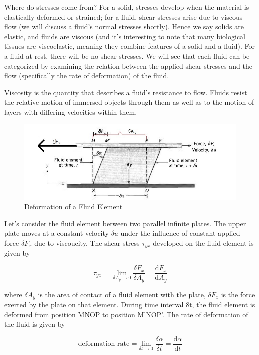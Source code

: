 \documentclass{article}
\begin{document}
Where do stresses come from? For a solid, stresses develop when the material is elastically deformed or strained; for a fluid, shear stresses arise due to viscous flow (we
will discuss a fluid's normal stresses shortly). Hence we say solids are elastic, and
fluids are viscous (and it's interesting to note that many biological tissues are viscoelastic, meaning they combine features of a solid and a fluid). For a fluid at rest,
there will be no shear stresses. We will see that each fluid can be categorized by examining the relation between the applied shear stresses and the flow (specifically the
rate of deformation) of the fluid.

Viscosity is the quantity that describes a fluid's resistance to flow. Fluids resist the relative motion of immersed objects through them as well as to the motion of layers with differing velocities within them.

\begin{figure}[h]
\includegraphics[width=\linewidth]{schematic for viscousity.jpg}
\caption{Deformation of a Fluid Element}
\label{fig:schem_vis}
\end{figure}

Let's consider the fluid element between two parallel infinite plates. The upper plate moves at a constant velocity $\delta u$ under the influence of constant applied force $\delta F_{x}$ due to viscoucity. The shear stress $\tau_{yx}$ developed on the fluid element is given by

$$\tau_{yx} = \lim_{\delta A_{y} \to 0} \frac{\delta F_{x}}{\delta A_{y}} = \frac{\text{d}F_{x}}{\text{d}A_{y}}$$

where $\delta A_{y}$ is the area of contact of a fluid element with the plate, $\delta F_{x}$ is the force exerted by the plate on that element. During time interval 8t, the fluid element is deformed from position MNOP to position M'NOP'. The rate of deformation of the
fluid is given by

$$\text{deformation rate =} \lim_{\delta t \to 0} \frac{\delta \alpha}{\delta t} = \frac{\text{d}\alpha}{\text{d}t}$$
\end{document}
